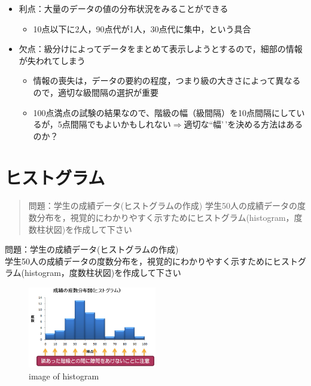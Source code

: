 \documentclass[
]{book}
\providecommand{\tightlist}{%
  \setlength{\itemsep}{0pt}\setlength{\parskip}{0pt}}
\theoremstyle{definition}
\theoremstyle{definition}
\theoremstyle{definition}
\theoremstyle{definition}
\theoremstyle{remark}
\begin{document}
\begin{itemize}
\tightlist
\item
  利点：大量のデータの値の分布状況をみることができる

  \begin{itemize}
  \tightlist
  \item
    10点以下に2人，90点代が1人，30点代に集中，という具合
  \end{itemize}
\item
  欠点：級分けによってデータをまとめて表示しようとするので，細部の情報が失われてしまう

  \begin{itemize}
  \tightlist
  \item
    情報の喪失は，データの要約の程度，つまり級の大きさによって異なるので，適切な級間隔の選択が重要
  \item
    100点満点の試験の結果なので、階級の幅（級間隔）を10点間隔にしているが，5点間隔でもよいかもしれない\(\Rightarrow\)適切な``幅'\,'を決める方法はあるのか？
  \end{itemize}
\end{itemize}

\hypertarget{ux30d2ux30b9ux30c8ux30b0ux30e9ux30e0}{%
\section{ヒストグラム}\label{ux30d2ux30b9ux30c8ux30b0ux30e9ux30e0}}

\begin{quote}
問題：学生の成績データ(ヒストグラムの作成)
学生50人の成績データの度数分布を，視覚的にわかりやすく示すためにヒストグラム(histogram，度数柱状図)を作成して下さい
\end{quote}

問題：学生の成績データ(ヒストグラムの作成) \\
学生50人の成績データの度数分布を，視覚的にわかりやすく示すためにヒストグラム(histogram，度数柱状図)を作成して下さい

\begin{figure}
\centering
\includegraphics[width=0.5\textwidth,height=\textheight]{images/lec02/pic_hist_scores.png}
\caption{image of histogram}
\end{figure}
\end{document}
